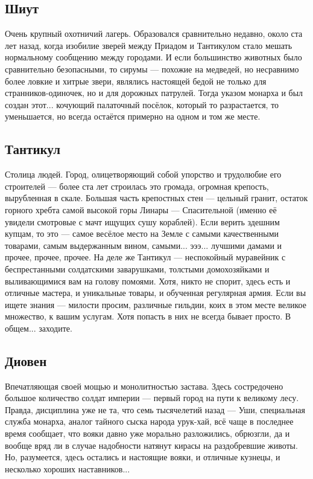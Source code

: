 \documentclass[12pt,a4paper]{book}
\begin{document}
\subsection{Шиут}

Очень крупный охотничий лагерь. Образовался сравнительно недавно, около ста лет назад, когда изобилие зверей между Приадом и Тантикулом стало мешать нормальному сообщению между городами. И если большинство животных было сравнительно безопасными, то сирумы --- похожие на медведей, но несравнимо более ловкие и хитрые звери, являлись настоящей бедой не только для странников-одиночек, но и для дорожных патрулей. Тогда указом монарха и был создан этот... кочующий палаточный посёлок, который то разрастается, то уменьшается, но всегда остаётся примерно на одном и том же месте.

\subsection{Тантикул}

Столица людей. Город, олицетворяющий собой упорство и трудолюбие его строителей --- более ста лет строилась это громада, огромная крепость, вырубленная в скале. Большая часть крепостных стен --- цельный гранит, остаток горного хребта самой высокой горы Линары --- Спасительной (именно её увидели смотровые с мачт ищущих сушу кораблей). Если верить здешним купцам, то это --- самое весёлое место на Земле с самыми качественными товарами, самым выдержанным вином, самыми... эээ... лучшими дамами и прочее, прочее, прочее. На деле же Тантикул --- неспокойный муравейник с беспрестанными солдатскими заварушками, толстыми домохозяйками и выливающимися вам на голову помоями. Хотя, никто не спорит, здесь есть и отличные мастера, и уникальные товары, и обученная регулярная армия. Если вы ищете знания --- милости просим, различные гильдии, коих в этом месте великое множество, к вашим услугам. Хотя попасть в них не всегда бывает просто. В общем... заходите.

\subsection{Диовен}

Впечатляющая своей мощью и монолитностью застава. Здесь состредочено большое количество солдат империи --- первый город на пути к великому лесу. Правда, дисциплина уже не та, что семь тысячелетий назад --- Уши, специальная служба монарха, аналог тайного сыска народа урук-хай, всё чаще в последнее время сообщает, что вояки давно уже морально разложились, обрюзгли, да и вообще вряд ли в случае надобности натянут кирасы на раздобревшие животы. Но, разумеется, здесь остались и настоящие вояки, и отличные кузнецы, и несколько хороших наставников...
\end{document}
